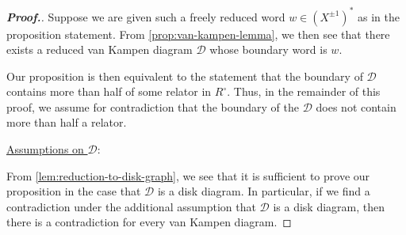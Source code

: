 \documentclass[11pt,a4paper,reqno]{amsart}
\theoremstyle{plain}
\theoremstyle{definition}
\theoremstyle{definition}
\newenvironment{myproof}{\begin{proof}[\normalfont\bfseries Proof.]}{\end{proof}}
\begin{document}
\begin{myproof}

	Suppose we are given such a freely reduced word $w\in (X^{\pm 1})^*$ as in the proposition statement.
	From \cref{prop:van-kampen-lemma}, we then see that there exists a reduced van Kampen diagram $\mathcal D$ whose boundary word is $w$.

	Our proposition is then equivalent to the statement that the boundary of $\mathcal D$ contains more than half of some relator in $R^\circ$.
	Thus, in the remainder of this proof, we assume for contradiction that the boundary of the $\mathcal D$ does not contain more than half a relator.

	\medskip
	\noindent
	\underline{Assumptions on $\mathcal D$}:\nopagebreak

	\smallskip\nopagebreak
	\noindent\nopagebreak
	From \cref{lem:reduction-to-disk-graph}, we see that it is sufficient to prove our proposition in the case that $\mathcal D$ is a disk diagram.
	In particular, if we find a contradiction under the additional assumption that $\mathcal D$ is a disk diagram, then there is a contradiction for every van Kampen diagram.


\end{myproof}
\end{document}
